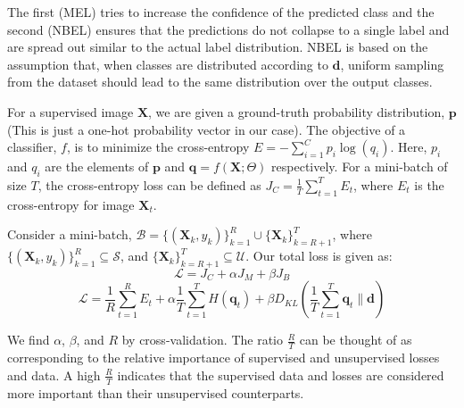 The first (MEL) tries to increase the confidence of the predicted class and the second (NBEL)
ensures that the predictions do not collapse to a single label and are spread out similar to
the actual label distribution. NBEL is based on the assumption that, when classes are distributed
according to $\mathbf{d}$, uniform sampling from the dataset should lead to the same distribution
over the output classes.

For a supervised image $\mathbf X$, we are given a ground-truth probability distribution, $\mathbf{p}$ (This is
just a one-hot probability vector in our case). The objective of a classifier, $f$, is to minimize the
cross-entropy $E = -\sum_{i=1}^{C}p_i \log(q_i)$. Here, $p_i$ and $q_i$
are the elements of $\mathbf{p}$ and $\mathbf{q} = f(\mathbf{X}; \Theta)$ respectively. For a
mini-batch of size $T$, the cross-entropy loss can be defined as $J_C = \frac{1}{T} \sum_{t=1}^{T}
E_t$, where $E_t$ is the cross-entropy for image $\mathbf{X}_t$.

Consider a mini-batch, $\mathcal{B} =
\{(\mathbf{X}_k, y_k)\}_{k=1}^R \cup \{\mathbf{X}_k\}_{k=R+1}^T$, where $\{(\mathbf{X}_k,
y_k)\}_{k=1}^{R} \subseteq \mathcal{S}$, and $\{\mathbf{X}_k\}_{k=R+1}^{T} \subseteq \mathcal{U}$. Our total loss
is given as:
\begin{equation}
	\mathcal{L} = J_C + \alpha J_M + \beta J_B
\end{equation}
\begin{equation}
	\mathcal{L} = \frac{1}{R} \sum_{t=1}^{R} E_t + \alpha \frac{1}{T}\sum_{t=1}^{T}H(\mathbf{q}_t) +
	\beta D_{KL}(\frac{1}{T}\sum_{t=1}^{T}\mathbf{q}_t \lVert \mathbf{d})
\end{equation}


We find $\alpha$, $\beta$, and $R$ by cross-validation. The ratio $\frac{R}{T}$ can be thought of as
corresponding to the relative importance of supervised and unsupervised losses and data. A high
$\frac{R}{T}$ indicates that the supervised data and losses are considered more important than their
unsupervised counterparts. 



